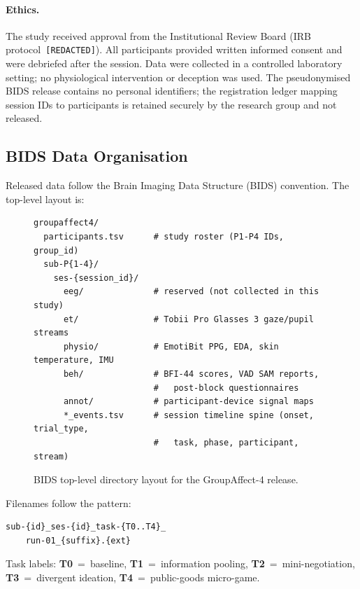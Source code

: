 \documentclass[sigconf,nonacm]{acmart}
\begin{document}
\paragraph{Ethics.}
The study received approval from the Institutional Review Board
(IRB protocol~\texttt{[REDACTED]}).
All participants provided written informed consent and were debriefed after
the session.
Data were collected in a controlled laboratory setting; no physiological
intervention or deception was used.
The pseudonymised BIDS release contains no personal identifiers;
the registration ledger mapping session IDs to participants is retained
securely by the research group and not released.

\subsection{BIDS Data Organisation}
\label{sec:bids_layout}

Released data follow the Brain Imaging Data Structure (BIDS) convention.
The top-level layout is:

\begin{figure}[t]
\centering
\begin{lstlisting}[basicstyle=\ttfamily\footnotesize,breaklines=false,xleftmargin=1.5em]
groupaffect4/
  participants.tsv      # study roster (P1-P4 IDs, group_id)
  sub-P{1-4}/
    ses-{session_id}/
      eeg/              # reserved (not collected in this study)
      et/               # Tobii Pro Glasses 3 gaze/pupil streams
      physio/           # EmotiBit PPG, EDA, skin temperature, IMU
      beh/              # BFI-44 scores, VAD SAM reports,
                        #   post-block questionnaires
      annot/            # participant-device signal maps
      *_events.tsv      # session timeline spine (onset, trial_type,
                        #   task, phase, participant, stream)
\end{lstlisting}
\vspace{-6pt}
\caption*{\small BIDS top-level directory layout for the GroupAffect-4 release.}
\label{fig:bids_tree}
\end{figure}

Filenames follow the pattern:
\begin{lstlisting}[basicstyle=\ttfamily\small,xleftmargin=0pt,xrightmargin=0pt]
sub-{id}_ses-{id}_task-{T0..T4}_
    run-01_{suffix}.{ext}
\end{lstlisting}
Task labels: \textbf{T0}~=~baseline, \textbf{T1}~=~information pooling,
\textbf{T2}~=~mini-negotiation, \textbf{T3}~=~divergent ideation,
\textbf{T4}~=~public-goods micro-game.
\end{document}
